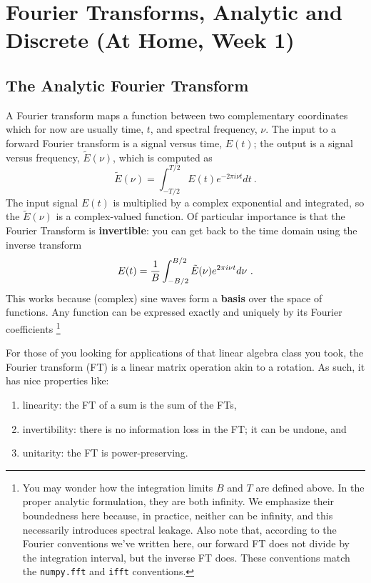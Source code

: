 \documentclass[11pt,preprint]{aastex}
\begin{document}
\section{Fourier Transforms, Analytic and Discrete (At Home, Week 1)} 
\label{pwrspectrum}
 
\subsection{The Analytic Fourier Transform}

\noindent
A Fourier transform maps a function between two complementary coordinates which
for now are usually time, $t$, and spectral frequency, $\nu$.
The input to a forward Fourier transform is a signal versus time, 
$E(t)$; the output is a signal versus frequency, $\tilde E(\nu)$,
which is computed as
% 
\begin{equation}
\tilde E(\nu) = \int_{-T/2}^{T/2} E(t) e^{-2 \pi i \nu t} dt \ .
\label{eq:dft}
\end{equation}
% 
\noindent The input signal $E(t)$ is multiplied by a complex
exponential and integrated, so the $\tilde E(\nu)$ is a complex-valued function. Of particular
importance is that the Fourier Transform is {\bf invertible}: 
you can get back to the time domain using the inverse transform
%
\begin{equation}
E(t) = {1 \over B} \int_{-B/2}^{B/2} \tilde E(\nu) e^{2 \pi i \nu t} d\nu \ .
\end{equation}
% 
This works because (complex) sine waves form a {\bf basis} over the space of functions.
Any function can be expressed exactly and uniquely by its Fourier coefficients
\footnote{You may wonder how
the integration limits $B$ and $T$ are defined above. In the proper
analytic formulation, they are both infinity. We emphasize their
boundedness here because, in practice, 
neither can be infinity, and this necessarily introduces spectral leakage. Also note that,
according to the Fourier conventions we've written here, our forward FT does not divide
by the integration interval, but the inverse FT does.  These conventions match 
the {\tt numpy.fft}
and {\tt ifft} conventions.}

For those of you looking for applications of that linear algebra class you took,
the Fourier transform (FT) is a linear matrix operation akin to a rotation. 
As such, it has nice properties like:
\begin{enumerate}
\item linearity: the FT
of a sum is the sum of the FTs, 
\item invertibility: there is no information loss in the FT; it can be undone, and 
\item unitarity: the FT is power-preserving.
\end{enumerate}
\end{document}
